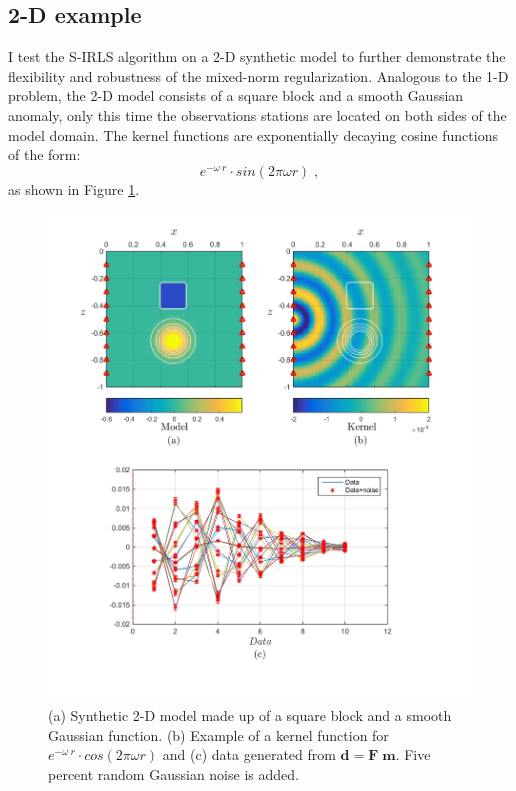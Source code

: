 \newpage
\subsection{2-D example}\label{2D_Section}
I test the S-IRLS algorithm on a 2-D synthetic model to further demonstrate the flexibility and robustness of the mixed-norm regularization. Analogous to the 1-D problem, the 2-D model consists of a square block and a smooth Gaussian anomaly, only this time the observations stations are located on both sides of the model domain. 
The kernel functions are exponentially decaying cosine functions of the form:
\begin{equation}
 	e^{-\omega\:r}\cdot sin(2 \pi \omega  r)\;,
\end{equation}
as shown in Figure \ref{fig:2D_Model_Kernel_data}. 

\begin{figure}[p]
\centering
\includegraphics[scale=0.60]{2D_Model_Kernel_data}
\caption{(a) Synthetic 2-D model made up of a square block and a smooth Gaussian function. (b) Example of a kernel function for $e^{-\omega\:r}\cdot cos(2 \pi \omega  r)$ and (c) data generated from $\mathbf{d =F \; m}$. Five percent random  Gaussian noise is added. }
\label{fig:2D_Model_Kernel_data}
\end{figure}

